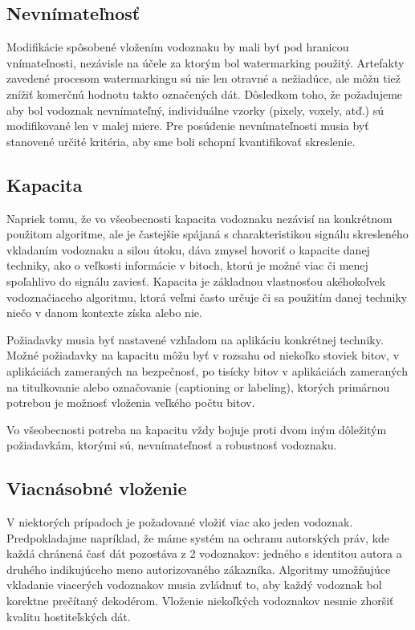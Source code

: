 \subsection{Nevnímateľnosť}
Modifikácie spôsobené vložením vodoznaku by mali byť pod hranicou vnímateľnosti, nezávisle na účele za ktorým bol watermarking použitý. Artefakty zavedené procesom watermarkingu sú nie len otravné a nežiadúce, ale môžu tiež znížiť komerčnú hodnotu takto označených dát. Dôsledkom toho, že požadujeme aby bol vodoznak nevnímateľný, individuálne vzorky (pixely, voxely, atď.) sú modifikované len v malej miere. Pre posúdenie nevnímateľnosti musia byť stanovené určité kritéria, aby sme boli schopní kvantifikovať skreslenie. \cite{Katzenbeisser}

\subsection{Kapacita}
Napriek tomu, že vo všeobecnosti kapacita vodoznaku nezávisí na konkrétnom použitom algoritme, ale je častejšie spájaná s charakteristikou signálu skresleného vkladaním vodoznaku a silou útoku, dáva zmysel hovoriť o kapacite danej techniky, ako o veľkosti informácie v bitoch, ktorú je možné viac či menej spoľahlivo do signálu zaviesť.
Kapacita je základnou vlastnosťou akéhokoľvek vodoznačiaceho algoritmu, ktorá veľmi často určuje či sa použitím danej techniky niečo v danom kontexte získa alebo nie.

Požiadavky musia byť nastavené vzhľadom na aplikáciu konkrétnej techniky. Možné požiadavky na kapacitu môžu byť v rozsahu od niekoľko stoviek bitov, v aplikáciách zameraných na bezpečnosť, po tisícky bitov v aplikáciách zameraných na titulkovanie alebo označovanie (captioning or labeling), ktorých primárnou potrebou je možnosť vloženia veľkého počtu bitov.

Vo všeobecnosti potreba na kapacitu vždy bojuje proti dvom iným dôležitým požiadavkám, ktorými sú, nevnímateľnosť a robustnosť vodoznaku. \cite{Barni}

\subsection{Viacnásobné vloženie}
V niektorých prípadoch je požadované vložiť viac ako jeden vodoznak. Predpokladajme napríklad, že máme systém na ochranu autorských práv, kde každá chránená časť dát pozostáva z 2 vodoznakov: jedného s identitou autora a druhého indikujúceho meno autorizovaného zákazníka. Algoritmy umožňujúce vkladanie viacerých vodoznakov musia zvládnuť to, aby každý vodoznak bol korektne prečítaný dekodérom. Vloženie niekoľkých vodoznakov nesmie zhoršiť kvalitu hostiteľských dát. \cite{Barni}
